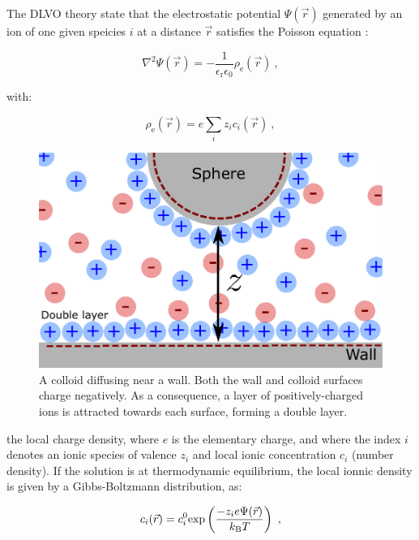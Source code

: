 The DLVO theory state that the electrostatic potential $\Psi(\vec{r})$ generated by an ion of one given speicies $i$ at a distance $\vec{r}$ satisfies the Poisson equation \cite{israelachvili_intermolecular_2015}:

\begin{equation}
	\nabla ^2 \Psi(\vec{r}) = -\frac{1}{\epsilon_\mathrm{r} \epsilon_0}  \rho_\mathrm{e}(\vec{r})~,
	\label{Eq:poisson}
\end{equation}

with:

\begin{equation}
	\rho_\mathrm{e}(\vec{r}) = e \sum _i z_i c_i (\vec{r}) ~,
	\label{Eq.3}
\end{equation}

\begin{figure}
	\includegraphics{02_body/chapter3/images/double_layer.pdf}
	\caption{A colloid diffusing near a wall. Both the wall and colloid surfaces charge negatively. As a consequence, a layer of positively-charged ions is attracted towards each surface, forming a double layer.}
	\label{Fig:double_layer}
\end{figure}


the local charge density, where $e$ is the elementary charge, and where the index $i$ denotes an ionic species of valence $z_i$ and local ionic concentration $c_i$ (number density). If the solution is at thermodynamic equilibrium, the local ionnic density is given by a Gibbs-Boltzmann distribution, as:

\begin{equation}
	c_i(\vec{r}) = c_i ^0 \textnormal{exp}\left(\frac{-z_i e \Psi(\vec{r})}{k_\mathrm{B} T }\right) ~,
	\label{Eq.4}
\end{equation}


